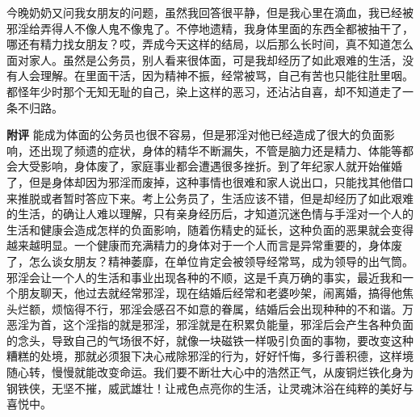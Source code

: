\begin{case}
    今晚奶奶又问我女朋友的问题，虽然我回答很平静，但是我心里在滴血，我已经被邪淫给弄得人不像人鬼不像鬼了。不停地遗精，我身体里面的东西全都被抽干了，哪还有精力找女朋友？哎，弄成今天这样的结局，以后那么长时间，真不知道怎么面对家人。虽然是公务员，别人看来很体面，可是我却经历了如此艰难的生活，没有人会理解。在里面干活，因为精神不振，经常被骂，自己有苦也只能往肚里咽。都怪年少时那个无知无耻的自己，染上这样的恶习，还沾沾自喜，却不知道走了一条不归路。

    \textbf{附评} 能成为体面的公务员也很不容易，但是邪淫对他已经造成了很大的负面影响，还出现了频遗的症状，身体的精华不断漏失，不管是脑力还是精力、体能等都会大受影响，身体废了，家庭事业都会遭遇很多挫折。到了年纪家人就开始催婚了，但是身体却因为邪淫而废掉，这种事情也很难和家人说出口，只能找其他借口来推脱或者暂时答应下来。考上公务员了，生活应该不错，但是却经历了如此艰难的生活，的确让人难以理解，只有亲身经历后，才知道沉迷色情与手淫对一个人的生活和健康会造成怎样的负面影响，随着伤精史的延长，这种负面的恶果就会变得越来越明显。一个健康而充满精力的身体对于一个人而言是异常重要的，身体废了，怎么谈女朋友？精神萎靡，在单位肯定会被领导经常骂，成为领导的出气筒。邪淫会让一个人的生活和事业出现各种的不顺，这是千真万确的事实，最近我和一个朋友聊天，他过去就经常邪淫，现在结婚后经常和老婆吵架，闹离婚，搞得他焦头烂额，烦恼得不行，邪淫会感召不如意的眷属，结婚后会出现种种的不和谐。万恶淫为首，这个淫指的就是邪淫，邪淫就是在积累负能量，邪淫后会产生各种负面的念头，导致自己的气场很不好，就像一块磁铁一样吸引负面的事物，要改变这种糟糕的处境，那就必须狠下决心戒除邪淫的行为，好好忏悔，多行善积德，这样境随心转，慢慢就能改变命运。我们要不断壮大心中的浩然正气，从废铜烂铁化身为钢铁侠，无坚不摧，威武雄壮！让戒色点亮你的生活，让灵魂沐浴在纯粹的美好与喜悦中。
\end{case}

